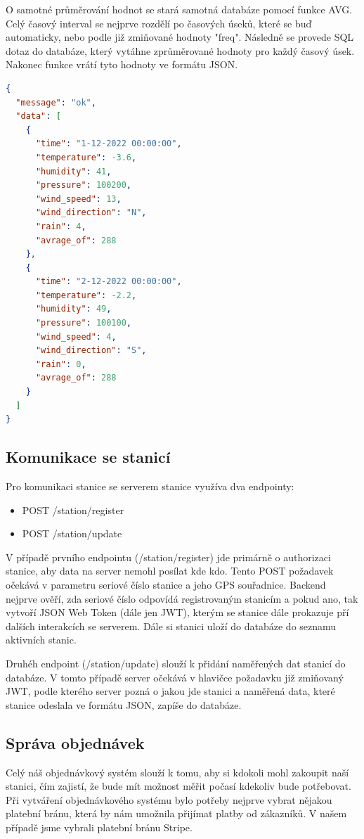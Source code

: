 O samotné průměrování hodnot se stará samotná databáze pomocí funkce AVG. Celý časový interval se nejprve rozdělí po časových úseků, které se buď automaticky, nebo podle již zmiňované hodnoty "freq".
Následně se provede SQL dotaz do databáze, který vytáhne zprůměrované hodnoty pro každý časový úsek. Nakonec funkce vrátí tyto hodnoty ve formátu JSON.
\begin{lstlisting}[language=json,firstnumber=1, caption=Příklad požadavku /stats/{gps}]
{
  "message": "ok",
  "data": [
    {
      "time": "1-12-2022 00:00:00",
      "temperature": -3.6,
      "humidity": 41,
      "pressure": 100200,
      "wind_speed": 13,
      "wind_direction": "N",
      "rain": 4,
      "avrage_of": 288
    },
    {
      "time": "2-12-2022 00:00:00",
      "temperature": -2.2,
      "humidity": 49,
      "pressure": 100100,
      "wind_speed": 4,
      "wind_direction": "S",
      "rain": 0,
      "avrage_of": 288
    }
  ]
}
\end{lstlisting}

\subsection{Komunikace se stanicí} \label{komunikace}
Pro komunikaci stanice se serverem stanice využíva dva endpointy:
\begin{itemize}
  \item POST /station/register
  \item POST /station/update
\end{itemize}
V případě prvního endpointu (/station/register) jde primárně o authorizaci stanice, aby data na server nemohl posílat kde kdo. Tento POST požadavek očekává v parametru 
seriové číslo stanice a jeho GPS souřadnice. Backend nejprve ověří, zda seriové číslo odpovídá registrovaným stanicím a pokud ano, tak vytvoří JSON Web Token (dále jen JWT),
kterým se stanice dále prokazuje pří dalších interakcích se serverem. Dále si stanici uloží do databáze do seznamu aktivních stanic.

Druhéh endpoint (/station/update) slouží k přidání naměřených dat stanicí do databáze. V tomto případě server očekává v hlavičce požadavku již zmiňovaný JWT,
podle kterého server pozná o jakou jde stanici a naměřená data, které stanice odeslala ve formátu JSON, zapíše do databáze.

\subsection{Správa objednávek}
Celý náš objednávkový systém slouží k tomu, aby si kdokoli mohl zakoupit naší stanici, čím zajistí, že bude mít možnost měřit počasí kdekoliv bude potřebovat. 
Při vytváření objednávkového systému bylo potřeby nejprve vybrat nějakou platební bránu, která by nám umožnila přijímat platby od zákazníků. V našem případě jsme vybrali platební bránu Stripe.

